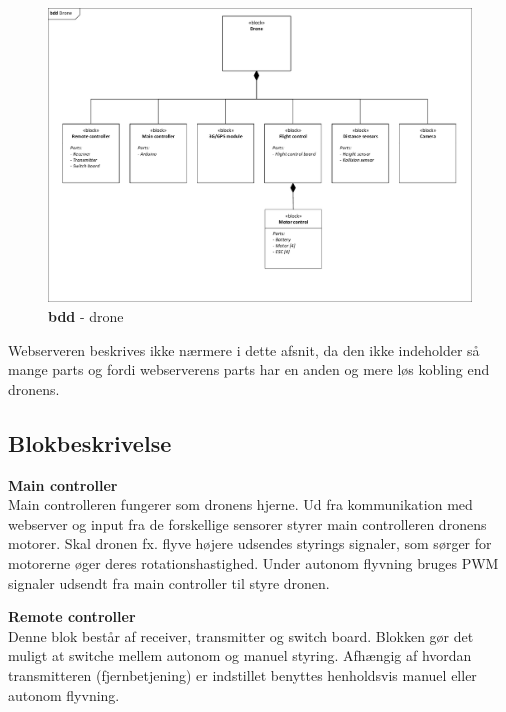 \begin{figure}[H]
\centering
\includegraphics[width=1.\textwidth]{Billeder/BDD/bdd_drone.pdf}
\vspace{-0.5cm}
\caption{\textbf{bdd} - drone}
\label{fig:bdd_drone}
\end{figure}

\vspace{0.5cm}

Webserveren beskrives ikke nærmere i dette afsnit, da den ikke indeholder så mange parts og fordi webserverens parts har en anden og mere løs kobling end dronens.

\newpage

\subsection{Blokbeskrivelse}

\textbf{Main controller}\\
Main controlleren fungerer som dronens hjerne. Ud fra kommunikation med webserver og input fra de forskellige sensorer styrer main controlleren dronens motorer. Skal dronen fx. flyve højere udsendes styrings signaler, som sørger for motorerne øger deres rotationshastighed. Under autonom flyvning bruges PWM signaler udsendt fra main controller til styre dronen. 

\textbf{Remote controller}\\
Denne blok består af receiver, transmitter og switch board. Blokken gør det muligt at switche mellem autonom og manuel styring. Afhængig af hvordan transmitteren (fjernbetjening) er indstillet benyttes henholdsvis manuel eller autonom flyvning.

